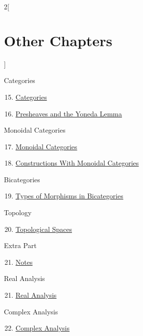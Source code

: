 \begin{multicols}{2}[\section{Other Chapters}]
\begin{enumerate}
\end{enumerate}
Categories
\begin{enumerate}
\setcounter{enumi}{14}
\item \hyperref[categories:section-phantom]{Categories}
\item \hyperref[presheaves-and-the-yoneda-lemma:section-phantom]{Presheaves and the Yoneda Lemma}
\end{enumerate}
Monoidal Categories
\begin{enumerate}
\setcounter{enumi}{16}
\item \hyperref[monoidal-categories:section-phantom]{Monoidal Categories}
\item \hyperref[constructions-with-monoidal-categories:section-phantom]{Constructions With Monoidal Categories}
\end{enumerate}
Bicategories
\begin{enumerate}
\setcounter{enumi}{18}
\item \hyperref[types-of-morphisms-in-bicategories:section-phantom]{Types of Morphisms in Bicategories}
\end{enumerate}
Topology
\begin{enumerate}
\setcounter{enumi}{19}
\item \hyperref[topological-spaces:section-phantom]{Topological Spaces}
\end{enumerate}
Extra Part
\begin{enumerate}
\setcounter{enumi}{20}
\item \hyperref[notes:section-phantom]{Notes}
\end{enumerate}
Real Analysis
\begin{enumerate}
\setcounter{enumi}{20}
\item \hyperref[real-analysis:section-phantom]{Real Analysis}
\end{enumerate}
Complex Analysis
\begin{enumerate}
\setcounter{enumi}{21}
\item \hyperref[complex-analysis:section-phantom]{Complex Analysis}
\end{enumerate}
\end{multicols}
